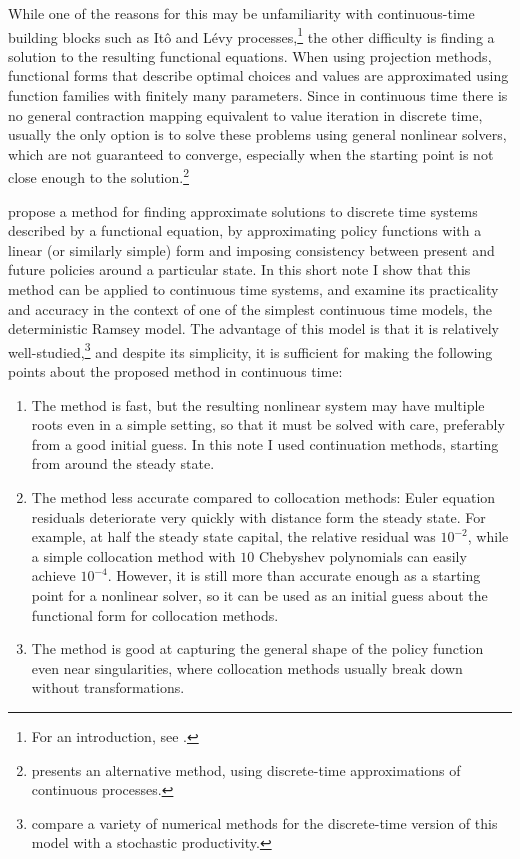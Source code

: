 \documentclass[a4paper,11pt]{article}
\begin{document}
While one of the reasons for this may be unfamiliarity with continuous-time building blocks such as Itô and Lévy processes,\footnote{For an introduction, see \textcite{oksendal2005applied}.} the other difficulty is finding a solution to the resulting functional equations. When using projection methods, functional forms that describe optimal choices and values are approximated using function families with finitely many parameters. Since in continuous time there is no general contraction mapping equivalent to value iteration in discrete time, usually the only option is to solve these problems using general nonlinear solvers, which are not guaranteed to converge, especially when the starting point is not close enough to the solution.\footnote{\textcite{kushner2013numerical} presents an alternative method, using discrete-time approximations of continuous processes.}

\textcite{den2015exact} propose a method for finding approximate solutions to discrete time systems described by a functional equation, by approximating policy functions with a linear (or similarly simple) form and imposing consistency between present and future policies around a particular state. In this short note I show that this method can be applied to continuous time systems, and examine its practicality and accuracy in the context of one of the simplest continuous time models, the deterministic Ramsey model. The advantage of this model is that it is relatively well-studied,\footnote{\textcite{aruoba2006comparing} compare a variety of numerical methods for the discrete-time version of this model with a stochastic productivity.} and despite its simplicity, it is sufficient for making the following points about the proposed method in continuous time:
\begin{enumerate}
\item The method is fast, but the resulting nonlinear system may have multiple roots even in a simple setting, so that it must be solved with care, preferably from a good initial guess. In this note I used continuation methods, starting from around the steady state.
\item The method less accurate compared to collocation methods: Euler equation residuals deteriorate very quickly with distance form the steady state. For example, at half the steady state capital, the relative residual was $10^{-2}$, while a simple collocation method with $10$ Chebyshev polynomials can easily achieve $10^{-4}$. However, it is still more than accurate enough as a starting point for a nonlinear solver, so it can be used as an initial guess about the functional form for collocation methods.
\item The method is good at capturing the general shape of the policy function even near singularities, where collocation methods usually break down without transformations.
\end{enumerate}
\end{document}
